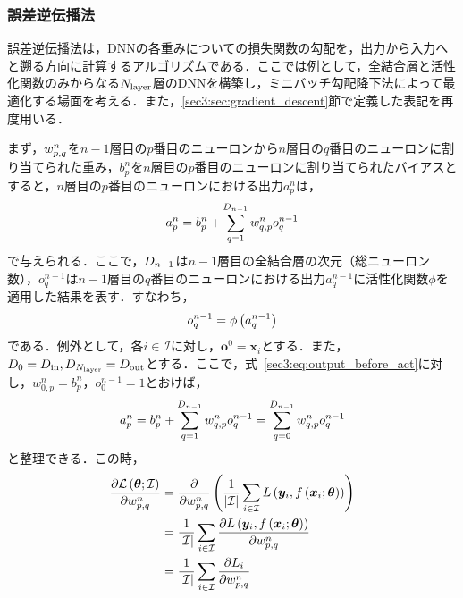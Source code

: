 \subsubsection{誤差逆伝播法}
\label{sec3:sec:backpropagation}
誤差逆伝播法は，DNNの各重みについての損失関数の勾配を，出力から入力へと遡る方向に計算するアルゴリズムである．ここでは例として，全結合層と活性化関数のみからなる$N_{\text{layer}}$層のDNNを構築し，ミニバッチ勾配降下法によって最適化する場面を考える\cite{higham2019deep}．また，\ref{sec3:sec:gradient_descent}節で定義した表記を再度用いる．

まず，$w_{p, q}^{n}$を$n - 1$層目の$p$番目のニューロンから$n$層目の$q$番目のニューロンに割り当てられた重み，$b_{p}^{n}$を$n$層目の$p$番目のニューロンに割り当てられたバイアスとすると，$n$層目の$p$番目のニューロンにおける出力$a_{p}^{n}$は，
\begin{equation}
    \label{sec3:eq:output_before_act}
    a_{p}^{n} = b_{p}^{n} + \sum_{q = 1}^{D_{n - 1}} w_{q, p}^{n} o_{q}^{n - 1}
\end{equation}
で与えられる．ここで，$D_{n - 1}$は$n - 1$層目の全結合層の次元（総ニューロン数），$o_{q}^{n - 1}$は$n - 1$層目の$q$番目のニューロンにおける出力$a_{q}^{n - 1}$に活性化関数$\phi$を適用した結果を表す．すなわち，
\begin{equation}
    o_{q}^{n - 1} = \phi\left(a_{q}^{n - 1}\right)
\end{equation}
である．例外として，各$i \in \mathcal{I}$に対し，$\bm{o}^{0} = \bm{x}_{i}$とする．また，$D_{0} = D_{\text{in}}, D_{N_{\text{layer}}} = D_{\text{out}}$とする．ここで，式~\eqref{sec3:eq:output_before_act}に対し，$w_{0, p}^{n} = b_{p}^{n}$，$o_{0}^{n - 1} = 1$とおけば，
\begin{equation}
    \label{sec3:eq:output_before_act_2}
    a_{p}^{n} = b_{p}^{n} + \sum_{q = 1}^{D_{n - 1}} w_{q, p}^{n} o_{q}^{n - 1}
    = \sum_{q = 0}^{D_{n - 1}} w_{q, p}^{n} o_{q}^{n - 1}
\end{equation}
と整理できる．この時，
\begin{align}
    \pdv{\mathcal{L}\left(\bm{\theta}; \mathcal{I}\right)}{w_{p, q}^{n}} & = \pdv{w_{p, q}^{n}} \left(\frac{1}{\left|\mathcal{I}\right|} \sum_{i \in \mathcal{I}} L\left(\bm{y}_{i}, f\left(\bm{x}_{i}; \bm{\theta}\right)\right)\right) \\
                                                                                                & = \frac{1}{\left|\mathcal{I}\right|} \sum_{i \in \mathcal{I}} \pdv{L\left(\bm{y}_{i}, f\left(\bm{x}_{i}; \bm{\theta}\right)\right)}{w_{p, q}^{n}}     \\
                                                                                                & = \frac{1}{\left|\mathcal{I}\right|} \sum_{i \in \mathcal{I}} \pdv{L_{i}}{w_{p, q}^{n}}
\end{align}
